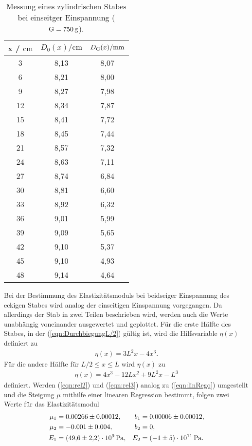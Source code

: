 \sloppy
\begin{table}[H]
  \centering
  \caption{Messung eines zylindrischen Stabes bei einseitger Einspannung ($\text G = \SI{750}{\gram}$).}
  \label{tab:werte2}
  \begin{tabular}{c c c}
    \toprule
    x / $\si{\centi\meter} $ & $ D_0(x) / \si{\centi\meter}$ & $D_{\text G}(x) / \si{\milli\meter}$ \\
    \midrule
    3 & 8,13 & 8,07 \\
    6 & 8,21 & 8,00 \\
    9 & 8,27 & 7,98 \\
    12 & 8,34 & 7,87 \\
    15 & 8,41 & 7,72 \\
    18 & 8,45 & 7,44 \\
    21 & 8,57 & 7,32 \\
    24 & 8,63 & 7,11 \\
    27 & 8,74 & 6,84 \\
    30 & 8,81 & 6,60 \\
    33 & 8,92 & 6,32 \\
    36 & 9,01 & 5,99 \\
    39 & 9,09 & 5,65 \\
    42 & 9,10 & 5,37 \\
    45 & 9,10 & 4,93 \\
    48 & 9,14 & 4,64 \\
    \bottomrule
  \end{tabular}
\end{table}

Bei der Bestimmung des Elastizitätsmoduls bei beidseiger Einspannung des eckigen Stabes wird analog der einseitigen Einspannung vorgegangen.
Da allerdings der Stab in zwei Teilen beschrieben wird, werden auch die Werte unabhängig voneinander ausgewertet und geplottet.
Für die erste Hälfte des Stabes, in der (\ref{eqn:DurchbiegungL/2}) gültig ist, wird die Hilfsvariable $\eta(x)$ definiert zu
\begin{align}
  \eta(x) = 3L^2x-4x^3.
  \label{eqn:rel2}
\end{align}
Für die andere Hälfte für $L/2 \leq x \leq L$ wird $\eta(x)$ zu 
\begin{align}
  \eta(x) = 4x^3 - 12L x^2+9L^2x-L^3
  \label{eqn:rel3}
\end{align}
definiert. Werden (\ref{eqn:rel2}) und (\ref{eqn:rel3}) analog zu (\ref{eqn:linRegq}) umgestellt und die Steigung $\mu$ mithilfe einer
linearen Regression bestimmt, folgen zwei Werte für das Elastizitätsmodul
\begin{align*}
  \mu_1&= 0.00266 \pm 0.00012, & b_1 &= 0.00006 \pm 0.00012, \\
  \mu_2 &= -0.001 \pm 0.004, & b_2 &= 0, \\
  E_1 &= \SI{49.6(2.2)e9}{\Pa}, & E_2 &= \SI{-1 (5)e11}{\Pa}.
\end{align*}


